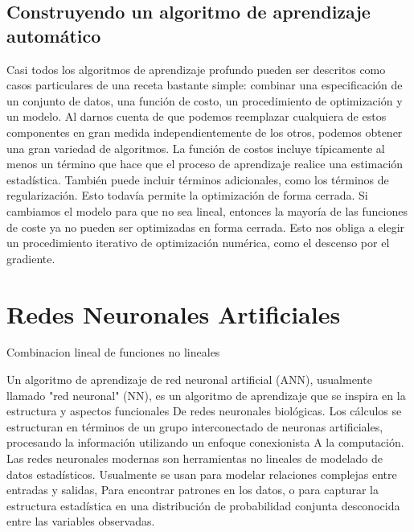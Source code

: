 \documentclass[a4paper,11pt,spanish]{book}
\begin{document}
    \subsection{Construyendo un algoritmo de aprendizaje automático}
      Casi todos los algoritmos de aprendizaje profundo pueden ser descritos como casos particulares de una receta bastante simple: 
      combinar una especificación de un conjunto de datos, una función de costo, un procedimiento de optimización y un modelo.
      Al darnos cuenta de que podemos reemplazar cualquiera de estos componentes en gran medida independientemente de los otros, podemos obtener una gran variedad de algoritmos.
      La función de costos incluye típicamente al menos un término que hace que el proceso de aprendizaje realice una estimación estadística. También puede incluir términos adicionales, 
      como los términos de regularización. Esto todavía permite la optimización de forma cerrada. 
      Si cambiamos el modelo para que no sea lineal, entonces la mayoría de las funciones de coste ya no pueden ser optimizadas en forma cerrada. 
      Esto nos obliga a elegir un procedimiento iterativo de optimización numérica, como el descenso por el gradiente.
    
    \section{Redes Neuronales Artificiales}
      Combinacion lineal de funciones no lineales
 \iffalse
      An artificial neural network (ANN) learning algorithm, usually called "neural network" (NN), is a learning algorithm that is inspired by the structure and functional aspects 
      of biological neural networks. Computations are structured in terms of an interconnected group of artificial neurons, processing information using a connectionist approach 
      to computation. Modern neural networks are non-linear statistical data modeling tools. They are usually used to model complex relationships between inputs and outputs, 
      to find patterns in data, or to capture the statistical structure in an unknown joint probability distribution between observed variables.
      
 \fi
      Un algoritmo de aprendizaje de red neuronal artificial (ANN), usualmente llamado "red neuronal" (NN), es un algoritmo de aprendizaje que se inspira en la estructura y aspectos funcionales
      De redes neuronales biológicas. Los cálculos se estructuran en términos de un grupo interconectado de neuronas artificiales, procesando la información utilizando un enfoque conexionista
      A la computación. Las redes neuronales modernas son herramientas no lineales de modelado de datos estadísticos. Usualmente se usan para modelar relaciones complejas entre entradas y salidas,
      Para encontrar patrones en los datos, o para capturar la estructura estadística en una distribución de probabilidad conjunta desconocida entre las variables observadas.
      
\end{document}
